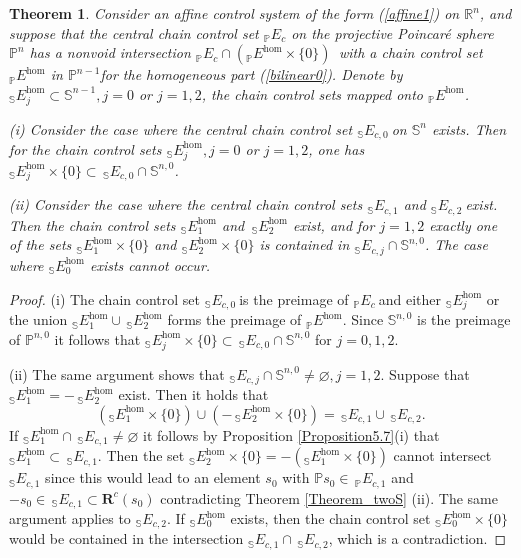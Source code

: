 \documentclass[preprint,12pt]{elsarticle}
\newtheorem{theorem}{Theorem}
\begin{document}
\begin{theorem}
Consider an affine control system of the form (\ref{affine1}) on
$\mathbb{R}^{n}$, and suppose that the central chain control set
$_{\mathbb{P}}E_{c}$ on the projective Poincar\'{e} sphere $\mathbb{P}^{n}$
has a nonvoid intersection $_{\mathbb{P}}E_{c}\cap\left(  _{\mathbb{P}}%
E^{\hom}\times\{0\}\right)  \,$ with a chain control set $_{\mathbb{P}}%
E^{\hom}$ in $\mathbb{P}^{n-1}$for the homogeneous part (\ref{bilinear0}).
Denote by $_{\mathbb{S}}E_{j}^{\hom}\subset\mathbb{S}^{n-1},j=0$ or $j=1,2$,
the chain control sets mapped onto $_{\mathbb{P}}E^{\hom}$.

(i) Consider the case where the central chain control set $_{\mathbb{S}%
}E_{c,0}\ $on $\mathbb{S}^{n}$ exists. Then for the chain control sets
$_{\mathbb{S}}E_{j}^{\hom},j=0$ or $j=1,2$, one has $_{\mathbb{S}}E_{j}^{\hom
}\times\{0\}\subset\,_{\mathbb{S}}E_{c,0}\cap\mathbb{S}^{n,0}$.

(ii) Consider the case where the central chain control sets $_{\mathbb{S}%
}E_{c,1}$ and $_{\mathbb{S}}E_{c,2}\ $exist. Then the chain control sets
$_{\mathbb{S}}E_{1}^{\hom}$ and $\,_{\mathbb{S}}E_{2}^{\hom}$ exist, and for
$j=1,2$ exactly one of the sets $_{\mathbb{S}}E_{1}^{\hom}\times\{0\}$ and
$_{\mathbb{S}}E_{2}^{\hom}\times\{0\}$ is contained in $_{\mathbb{S}}%
E_{c,j}\cap\mathbb{S}^{n,0}$. The case where $_{\mathbb{S}}E_{0}^{\hom}$
exists cannot occur.
\end{theorem}

\begin{proof}
(i) The chain control set $_{\mathbb{S}}E_{c,0}\ $is the preimage of
$_{\mathbb{P}}E_{c}\ $and either $_{\mathbb{S}}E_{j}^{\hom}$ or the union
$_{\mathbb{S}}E_{1}^{\hom}\cup\,_{\mathbb{S}}E_{2}^{\hom}$ forms the preimage
of $_{\mathbb{P}}E^{\hom}$. Since $\mathbb{S}^{n,0}$ is the preimage of
$\mathbb{P}^{n,0}$ it follows that $_{\mathbb{S}}E_{j}^{\hom}\times
\{0\}\subset\,_{\mathbb{S}}E_{c,0}\cap\mathbb{S}^{n,0}$ for $j=0,1,2$.

(ii) The same argument shows that $_{\mathbb{S}}E_{c,j}\cap\mathbb{S}%
^{n,0}\not =\varnothing,j=1,2$. Suppose that $_{\mathbb{S}}E_{1}^{\hom
}=-\,_{\mathbb{S}}E_{2}^{\hom}$ exist. Then it holds that
\[
\left(  _{\mathbb{S}}E_{1}^{\hom}\times\{0\}\right)  \cup\left(
-\,_{\mathbb{S}}E_{2}^{\hom}\times\{0\}\right)  =\,_{\mathbb{S}}E_{c,1}%
\cup\,_{\mathbb{S}}E_{c,2}.
\]
If $_{\mathbb{S}}E_{1}^{\hom}\cap\,_{\mathbb{S}}E_{c,1}\not =\varnothing$ it
follows by Proposition \ref{Proposition5.7}(i) that $_{\mathbb{S}}E_{1}^{\hom
}\subset\,_{\mathbb{S}}E_{c,1}$. Then the set $_{\mathbb{S}}E_{2}^{\hom}%
\times\{0\}=-\left(  _{\mathbb{S}}E_{1}^{\hom}\times\{0\}\right)  $ cannot
intersect $_{\mathbb{S}}E_{c,1}$ since this would lead to an element $s_{0}$
with $\mathbb{P}s_{0}\in\,_{\mathbb{P}}E_{c,1}$ and $-s_{0}\in\,_{\mathbb{S}%
}E_{c,1}\subset\mathbf{R}^{c}(s_{0})$ contradicting Theorem \ref{Theorem_twoS}%
(ii). The same argument applies to $_{\mathbb{S}}E_{c,2}$. If $_{\mathbb{S}%
}E_{0}^{\hom}$ exists, then the chain control set $_{\mathbb{S}}E_{0}^{\hom
}\times\{0\}$ would be contained in the intersection $_{\mathbb{S}}E_{c,1}%
\cap\,_{\mathbb{S}}E_{c,2}$, which is a contradiction.
\end{proof}
\end{document}
